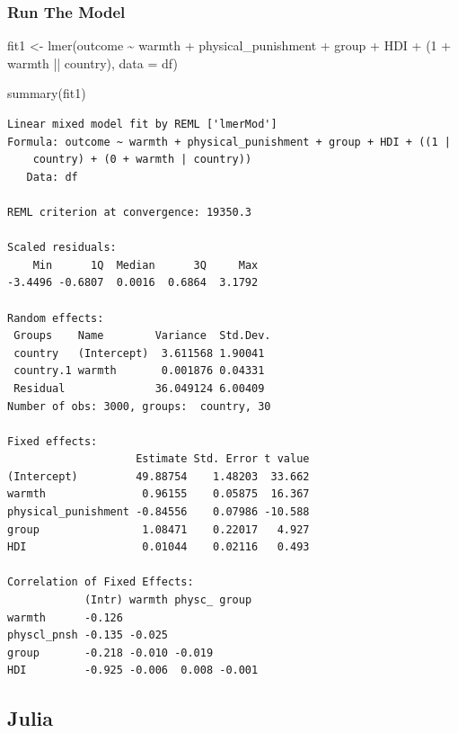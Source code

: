 \documentclass[
  letterpaper,
  DIV=11,
  numbers=noendperiod,
  oneside]{scrreprt}
\newenvironment{Shaded}{\begin{snugshade}}{\end{snugshade}}
\newcommand{\AttributeTok}[1]{\textcolor[rgb]{0.40,0.45,0.13}{#1}}
\newcommand{\DecValTok}[1]{\textcolor[rgb]{0.68,0.00,0.00}{#1}}
\newcommand{\FunctionTok}[1]{\textcolor[rgb]{0.28,0.35,0.67}{#1}}
\newcommand{\NormalTok}[1]{\textcolor[rgb]{0.00,0.23,0.31}{#1}}
\newcommand{\OtherTok}[1]{\textcolor[rgb]{0.00,0.23,0.31}{#1}}
\newcommand{\SpecialCharTok}[1]{\textcolor[rgb]{0.37,0.37,0.37}{#1}}
\begin{document}
\hypertarget{run-the-model-1}{%
\subsubsection{Run The Model}\label{run-the-model-1}}

\begin{Shaded}
\begin{Highlighting}[]
\NormalTok{fit1 }\OtherTok{\textless{}{-}} \FunctionTok{lmer}\NormalTok{(outcome }\SpecialCharTok{\textasciitilde{}}\NormalTok{ warmth }\SpecialCharTok{+}\NormalTok{ physical\_punishment }\SpecialCharTok{+} 
\NormalTok{               group }\SpecialCharTok{+}\NormalTok{ HDI }\SpecialCharTok{+}
\NormalTok{               (}\DecValTok{1} \SpecialCharTok{+}\NormalTok{ warmth }\SpecialCharTok{||}\NormalTok{ country),}
             \AttributeTok{data =}\NormalTok{ df)}

\FunctionTok{summary}\NormalTok{(fit1)}
\end{Highlighting}
\end{Shaded}

\begin{verbatim}
Linear mixed model fit by REML ['lmerMod']
Formula: outcome ~ warmth + physical_punishment + group + HDI + ((1 |  
    country) + (0 + warmth | country))
   Data: df

REML criterion at convergence: 19350.3

Scaled residuals: 
    Min      1Q  Median      3Q     Max 
-3.4496 -0.6807  0.0016  0.6864  3.1792 

Random effects:
 Groups    Name        Variance  Std.Dev.
 country   (Intercept)  3.611568 1.90041 
 country.1 warmth       0.001876 0.04331 
 Residual              36.049124 6.00409 
Number of obs: 3000, groups:  country, 30

Fixed effects:
                    Estimate Std. Error t value
(Intercept)         49.88754    1.48203  33.662
warmth               0.96155    0.05875  16.367
physical_punishment -0.84556    0.07986 -10.588
group                1.08471    0.22017   4.927
HDI                  0.01044    0.02116   0.493

Correlation of Fixed Effects:
            (Intr) warmth physc_ group 
warmth      -0.126                     
physcl_pnsh -0.135 -0.025              
group       -0.218 -0.010 -0.019       
HDI         -0.925 -0.006  0.008 -0.001
\end{verbatim}

\subsection{Julia}
\end{document}
